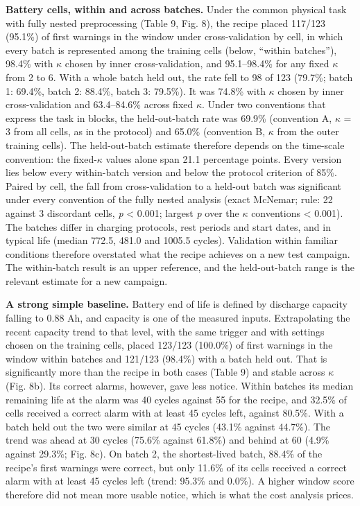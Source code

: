 \documentclass[a4paper,fleqn,doubleblind]{cas-dc}
\begin{document}
\textbf{Battery cells, within and across batches.} Under the common physical task with fully nested preprocessing (Table 9, Fig. 8), the recipe placed 117/123 (95.1\%) of first warnings in the window under cross-validation by cell, in which every batch is represented among the training cells (below, ``within batches''), 98.4\% with $\kappa$ chosen by inner cross-validation, and 95.1--98.4\% for any fixed $\kappa$ from 2 to 6. With a whole batch held out, the rate fell to 98 of 123 (79.7\%; batch 1: 69.4\%, batch 2: 88.4\%, batch 3: 79.5\%). It was 74.8\% with $\kappa$ chosen by inner cross-validation and 63.4--84.6\% across fixed $\kappa$. Under two conventions that express the task in blocks, the held-out-batch rate was 69.9\% (convention A, $\kappa$ = 3 from all cells, as in the protocol) and 65.0\% (convention B, $\kappa$ from the outer training cells). The held-out-batch estimate therefore depends on the time-scale convention: the fixed-$\kappa$ values alone span 21.1 percentage points. Every version lies below every within-batch version and below the protocol criterion of 85\%. Paired by cell, the fall from cross-validation to a held-out batch was significant under every convention of the fully nested analysis (exact McNemar; rule: 22 against 3 discordant cells, \textit{p} < 0.001; largest \textit{p} over the $\kappa$ conventions < 0.001). The batches differ in charging protocols, rest periods and start dates, and in typical life (median 772.5, 481.0 and 1005.5 cycles). Validation within familiar conditions therefore overstated what the recipe achieves on a new test campaign. The within-batch result is an upper reference, and the held-out-batch range is the relevant estimate for a new campaign.

\textbf{A strong simple baseline.} Battery end of life is defined by discharge capacity falling to 0.88 Ah, and capacity is one of the measured inputs. Extrapolating the recent capacity trend to that level, with the same trigger and with settings chosen on the training cells, placed 123/123 (100.0\%) of first warnings in the window within batches and 121/123 (98.4\%) with a batch held out. That is significantly more than the recipe in both cases (Table 9) and stable across $\kappa$ (Fig. 8b). Its correct alarms, however, gave less notice. Within batches its median remaining life at the alarm was 40 cycles against 55 for the recipe, and 32.5\% of cells received a correct alarm with at least 45 cycles left, against 80.5\%. With a batch held out the two were similar at 45 cycles (43.1\% against 44.7\%). The trend was ahead at 30 cycles (75.6\% against 61.8\%) and behind at 60 (4.9\% against 29.3\%; Fig. 8c). On batch 2, the shortest-lived batch, 88.4\% of the recipe's first warnings were correct, but only 11.6\% of its cells received a correct alarm with at least 45 cycles left (trend: 95.3\% and 0.0\%). A higher window score therefore did not mean more usable notice, which is what the cost analysis prices.
\end{document}
